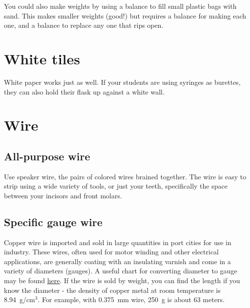 You could also make weights by using a balance 
to fill small plastic bags with sand. 
This makes smaller weights (good!) 
but requires a balance for making each one, 
and a balance to replace any one that rips open.

\section{White tiles}
White paper works just as well. 
If your students are using syringes as burettes, 
they can also hold their flask up against a white wall.

\section{Wire}
\label{sec:wire}
\subsection{All-purpose wire}
Use speaker wire, 
the pairs of colored wires brained together. 
The wire is easy to strip using a wide variety of tools, 
or just your teeth, 
specifically the space between your incisors and front molars.

\subsection{Specific gauge wire}
Copper wire is imported and sold in large quantities in port cities 
for use in industry. 
These wires, 
often used for motor winding and other electrical applications, 
are generally coating with an insulating varnish 
and come in a variety of diameters (gauges). 
A useful chart for converting diameter to gauge may be found  
\href{http://www.dave-cushman.net/elect/wiregauge.html}{here}. 
If the wire is sold by weight, 
you can find the length if you know the diameter - 
the density of copper metal at room temperature is 8.94~g/cm$^{3}$. 
For example, 
with 0.375~mm wire, 
250~g is about 63 meters.

